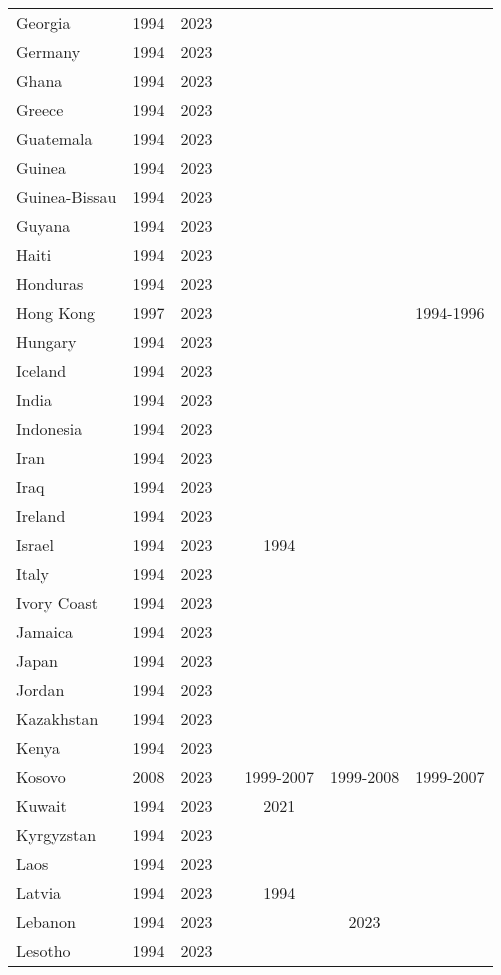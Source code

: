 {\begin{longtable}{lcccccc}
Georgia & 1994 & 2023 &  &  &  & \\
\addlinespace
Germany & 1994 & 2023 &  &  &  & \\
Ghana & 1994 & 2023 &  &  &  & \\
Greece & 1994 & 2023 &  &  &  & \\
Guatemala & 1994 & 2023 &  &  &  & \\
Guinea & 1994 & 2023 &  &  &  & \\
\addlinespace
Guinea-Bissau & 1994 & 2023 &  &  &  & \\
Guyana & 1994 & 2023 &  &  &  & \\
Haiti & 1994 & 2023 &  &  &  & \\
Honduras & 1994 & 2023 &  &  &  & \\
Hong Kong & 1997 & 2023 &  &  &  & 1994-1996\\
\addlinespace
Hungary & 1994 & 2023 &  &  &  & \\
Iceland & 1994 & 2023 &  &  &  & \\
India & 1994 & 2023 &  &  &  & \\
Indonesia & 1994 & 2023 &  &  &  & \\
Iran & 1994 & 2023 &  &  &  & \\
\addlinespace
Iraq & 1994 & 2023 &  &  &  & \\
Ireland & 1994 & 2023 &  &  &  & \\
Israel & 1994 & 2023 &  & 1994 &  & \\
Italy & 1994 & 2023 &  &  &  & \\
Ivory Coast & 1994 & 2023 &  &  &  & \\
\addlinespace
Jamaica & 1994 & 2023 &  &  &  & \\
Japan & 1994 & 2023 &  &  &  & \\
Jordan & 1994 & 2023 &  &  &  & \\
Kazakhstan & 1994 & 2023 &  &  &  & \\
Kenya & 1994 & 2023 &  &  &  & \\
\addlinespace
Kosovo & 2008 & 2023 &  & 1999-2007 & 1999-2008 & 1999-2007\\
Kuwait & 1994 & 2023 &  & 2021 &  & \\
Kyrgyzstan & 1994 & 2023 &  &  &  & \\
Laos & 1994 & 2023 &  &  &  & \\
Latvia & 1994 & 2023 &  & 1994 &  & \\
\addlinespace
Lebanon & 1994 & 2023 &  &  & 2023 & \\
Lesotho & 1994 & 2023 &  &  &  & \\

\end{longtable}}
